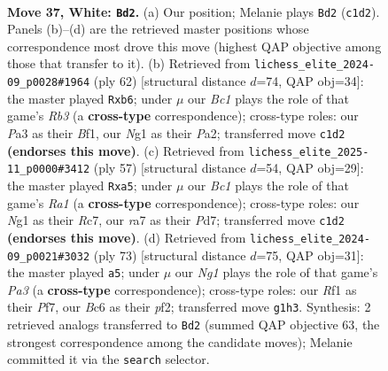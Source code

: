 \documentclass[11pt]{article}
\begin{document}
\clearpage

\begin{figure}[p]\centering
\begin{subfigure}{0.46\textwidth}\centering
\resizebox{\linewidth}{!}{%
\newchessgame
\chessboard[
  setfen={3r4/r7/p1Bnbk2/p4ppp/8/PP3PP1/7P/RKB2RN1 w - - 1 37},
  showmover=false,
  pgfstyle=straightmove, color=movearrow, markmove={c1-d2}
]}
\caption{}
\end{subfigure}\hfill
\begin{subfigure}{0.46\textwidth}\centering
\resizebox{\linewidth}{!}{%
\newchessgame
\chessboard[
  setfen={2kr4/1p2r3/1p3n1p/3P1pp1/2P1p3/1R5P/P4PP1/1R3BK1 w - - 0 32},
  showmover=false,
  pgfstyle=straightmove, color=movearrow, markmove={b3-b6}
]}
\caption{}
\end{subfigure}
\\[4pt]
\begin{subfigure}{0.46\textwidth}\centering
\resizebox{\linewidth}{!}{%
\newchessgame
\chessboard[
  setfen={r7/2rp1ppk/4p3/Pbb1P1BP/2p3R1/2P2P1R/1KPN4/8 b - - 2 29},
  showmover=false,
  pgfstyle=straightmove, color=movearrow, markmove={a8-a5}
]}
\caption{}
\end{subfigure}\hfill
\begin{subfigure}{0.46\textwidth}\centering
\resizebox{\linewidth}{!}{%
\newchessgame
\chessboard[
  setfen={3r1k2/5pb1/p3b2p/1p1p2p1/3P2P1/1P3B1P/1PNR1PK1/8 b - - 4 37},
  showmover=false,
  pgfstyle=straightmove, color=movearrow, markmove={a6-a5}
]}
\caption{}
\end{subfigure}
\caption{\textbf{Move 37, White: \texttt{Bd2}.} (a) Our position; Melanie plays \texttt{Bd2} (\texttt{c1d2}). Panels (b)--(d) are the retrieved master positions whose correspondence most drove this move (highest QAP objective among those that transfer to it). (b) Retrieved from \texttt{lichess\_elite\_2024-09\_p0028\#1964} (ply 62) [structural distance $d$=74, QAP obj=34]: the master played \texttt{Rxb6}; under $\mu$ our \emph{Bc1} plays the role of that game's \emph{Rb3} (a \textbf{cross-type} correspondence); cross-type roles: our \emph{P}a3 as their \emph{B}f1, our \emph{N}g1 as their \emph{P}a2; transferred move \texttt{c1d2} \textbf{(endorses this move)}. (c) Retrieved from \texttt{lichess\_elite\_2025-11\_p0000\#3412} (ply 57) [structural distance $d$=54, QAP obj=29]: the master played \texttt{Rxa5}; under $\mu$ our \emph{Bc1} plays the role of that game's \emph{Ra1} (a \textbf{cross-type} correspondence); cross-type roles: our \emph{N}g1 as their \emph{R}c7, our \emph{r}a7 as their \emph{P}d7; transferred move \texttt{c1d2} \textbf{(endorses this move)}. (d) Retrieved from \texttt{lichess\_elite\_2024-09\_p0021\#3032} (ply 73) [structural distance $d$=75, QAP obj=31]: the master played \texttt{a5}; under $\mu$ our \emph{Ng1} plays the role of that game's \emph{Pa3} (a \textbf{cross-type} correspondence); cross-type roles: our \emph{R}f1 as their \emph{P}f7, our \emph{B}c6 as their \emph{p}f2; transferred move \texttt{g1h3}. Synthesis: 2 retrieved analogs transferred to \texttt{Bd2} (summed QAP objective 63, the strongest correspondence among the candidate moves); Melanie committed it via the \texttt{search} selector.}
\label{fig:thought-m72}
\end{figure}
\end{document}
